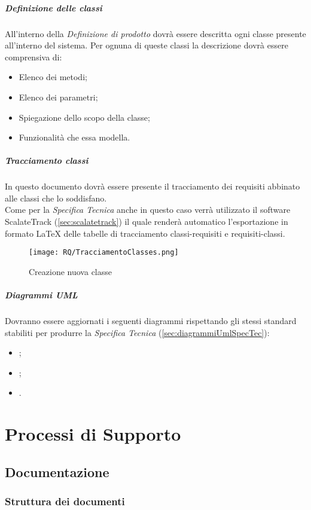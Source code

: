 \documentclass{scalatekids-article}
\begin{document}
\subparagraph{Definizione delle classi}
All'interno della \textit{Definizione di prodotto} dovrà essere descritta ogni
classe presente all'interno del sistema. Per ognuna di queste classi la descrizione
dovrà essere comprensiva di:
\begin{itemize}
\item Elenco dei metodi;
\item Elenco dei parametri;
\item Spiegazione dello scopo della classe;
\item Funzionalità che essa modella.
\end{itemize}

\subparagraph{Tracciamento classi}

In questo documento dovrà essere presente il tracciamento dei requisiti abbinato
alle classi che lo soddisfano.\\Come per la \textit{Specifica Tecnica} anche in
questo caso verrà utilizzato il software ScalateTrack (\ref{sec:scalatetrack})
il quale renderà automatico l'esportazione in formato \LaTeX\xspace delle
tabelle di tracciamento classi-requisiti e requisiti-classi.

\begin{figure}[H]
  \centering
  \texttt{[image: RQ/TracciamentoClasses.png]}
  \caption{Creazione nuova classe}
\end{figure}

\subparagraph{Diagrammi UML}

Dovranno essere aggiornati i seguenti diagrammi rispettando gli stessi standard
stabiliti per produrre la \textit{Specifica Tecnica} (\ref{sec:diagrammiUmlSpecTec}):
\begin{itemize}
\item {};
\item {};
\item {}.
\end{itemize}

\section{Processi di Supporto}

\subsection{Documentazione}

\subsubsection{Struttura dei documenti}
\end{document}
